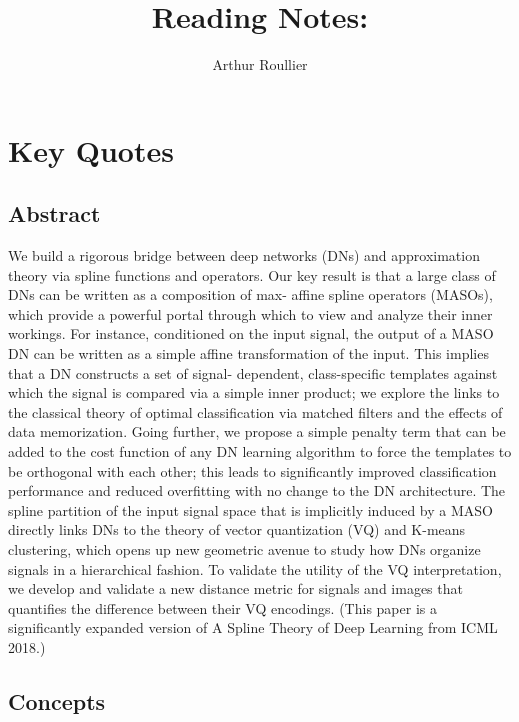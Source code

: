 \documentclass{article}
\title{Reading Notes: \cite{balestriero_mad_2018}}
\author{Arthur Roullier}
\begin{document}
\maketitle




\section{Key Quotes}


\subsection{Abstract}
We build a rigorous bridge between deep networks (DNs) and approximation theory via spline functions and operators. Our key result is that a large class of DNs can be written as a composition of max- affine spline operators (MASOs), which provide a powerful portal through which to view and analyze their inner workings. For instance, conditioned on the input signal, the output of a MASO DN can be written as a simple affine transformation of the input. This implies that a DN constructs a set of signal- dependent, class-specific templates against which the signal is compared via a simple inner product; we explore the links to the classical theory of optimal classification via matched filters and the effects of data memorization. Going further, we propose a simple penalty term that can be added to the cost function of any DN learning algorithm to force the templates to be orthogonal with each other; this leads to significantly improved classification performance and reduced overfitting with no change to the DN architecture. The spline partition of the input signal space that is implicitly induced by a MASO directly links DNs to the theory of vector quantization (VQ) and K-means clustering, which opens up new geometric avenue to study how DNs organize signals in a hierarchical fashion. To validate the utility of the VQ interpretation, we develop and validate a new distance metric for signals and images that quantifies the difference between their VQ encodings. (This paper is a significantly expanded version of A Spline Theory of Deep Learning from ICML 2018.)


\subsection{Concepts}
\end{document}
